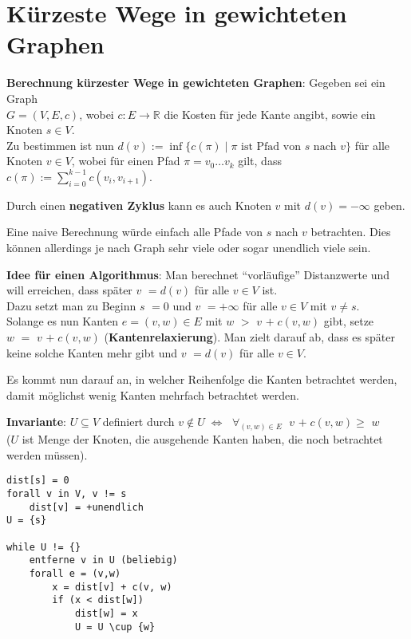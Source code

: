 \pagebreak

\section{%
    Kürzeste Wege in gewichteten Graphen%
}

\textbf{Berechnung kürzester Wege in gewichteten Graphen}:
Gegeben sei ein Graph \\
$G = (V, E, c)$, wobei $c: E \rightarrow \mathbb{R}$
die Kosten für jede Kante angibt, sowie ein Knoten $s \in V$. \\
Zu bestimmen ist nun
$d(v) := \inf\{c(\pi) \;|\; \pi \text{ ist Pfad von } s \text{ nach } v\}$
für alle Knoten $v \in V$, wobei für einen Pfad
$\pi = v_0 \dotsc v_k$ gilt, dass
$c(\pi) := \sum_{i=0}^{k-1} c(v_i, v_{i+1})$.

Durch einen \textbf{negativen Zyklus} kann es auch Knoten $v$ mit
$d(v) = -\infty$ geben.

Eine naive Berechnung würde einfach alle Pfade von $s$ nach $v$ betrachten.
Dies können allerdings je nach Graph sehr viele oder sogar unendlich viele
sein.

\linie

\textbf{Idee für einen Algorithmus}:
Man berechnet "`vorläufige"' Distanzwerte  und will erreichen,
dass später \code{dist[}$v$\code{]} $= d(v)$ für alle $v \in V$ ist. \\
Dazu setzt man zu Beginn \code{dist[}$s$\code{]} $= 0$ und
\code{dist[}$v$\code{]} $= +\infty$ für alle $v \in V$ mit $v \not= s$. \\
Solange es nun Kanten $e = (v, w) \in E$ mit
\code{dist[}$w$\code{]} $>$ \code{dist[}$v$\code{]} $+\; c(v,w)$ gibt, setze \\
\code{dist[}$w$\code{]} $=$ \code{dist[}$v$\code{]} $+\; c(v,w)$
(\textbf{Kantenrelaxierung}).
Man zielt darauf ab, dass es später keine solche Kanten mehr gibt
und \code{dist[}$v$\code{]} $= d(v)$ für alle $v \in V$.

Es kommt nun darauf an, in welcher Reihenfolge die Kanten betrachtet werden,
damit möglichst wenig Kanten mehrfach betrachtet werden.

\textbf{Invariante}:
$U \subseteq V$ definiert durch $v \notin U \;\Leftrightarrow\;$
$\forall_{(v,w) \in E}\;$
\code{dist[}$v$\code{]} $+\; c(v,w) \ge$ \code{dist[}$w$\code{]} \\
($U$ ist Menge der Knoten, die ausgehende Kanten haben, die noch
betrachtet werden müssen).

\begin{lstlisting}
dist[s] = 0
forall v in V, v != s
    dist[v] = +unendlich
U = {s}

while U != {}
    entferne v in U (beliebig)
    forall e = (v,w)
        x = dist[v] + c(v, w)
        if (x < dist[w])
            dist[w] = x
            U = U \cup {w}
\end{lstlisting}

